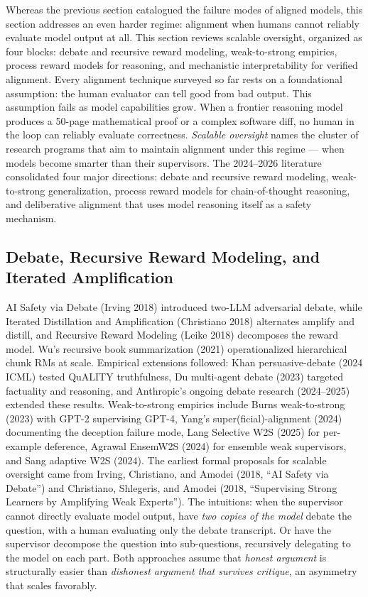 Whereas the previous section catalogued the failure modes of aligned models, this section addresses an even harder regime: alignment when humans cannot reliably evaluate model output at all. This section reviews scalable oversight, organized as four blocks: debate and recursive reward modeling, weak-to-strong empirics, process reward models for reasoning, and mechanistic interpretability for verified alignment. Every alignment technique surveyed so far rests on a foundational assumption: the human evaluator can tell good from bad output. This assumption fails as model capabilities grow. When a frontier reasoning model produces a 50-page mathematical proof or a complex software diff, no human in the loop can reliably evaluate correctness. \emph{Scalable oversight} names the cluster of research programs that aim to maintain alignment under this regime --- when models become smarter than their supervisors. The 2024--2026 literature consolidated four major directions: debate and recursive reward modeling, weak-to-strong generalization, process reward models for chain-of-thought reasoning, and deliberative alignment that uses model reasoning itself as a safety mechanism.

\subsection{Debate, Recursive Reward Modeling, and Iterated Amplification}\label{debate-recursive-reward-modeling-and-iterated-amplification}

AI Safety via Debate (Irving 2018) introduced two-LLM adversarial debate, while Iterated Distillation and Amplification (Christiano 2018) alternates amplify and distill, and Recursive Reward Modeling (Leike 2018) decomposes the reward model. Wu's recursive book summarization (2021) operationalized hierarchical chunk RMs at scale. Empirical extensions followed: Khan persuasive-debate (2024 ICML) tested QuALITY truthfulness, Du multi-agent debate (2023) targeted factuality and reasoning, and Anthropic's ongoing debate research (2024--2025) extended these results. Weak-to-strong empirics include Burns weak-to-strong (2023) with GPT-2 supervising GPT-4, Yang's super(ficial)-alignment (2024) documenting the deception failure mode, Lang Selective W2S (2025) for per-example deference, Agrawal EnsemW2S (2024) for ensemble weak supervisors, and Sang adaptive W2S (2024). The earliest formal proposals for scalable oversight came from Irving, Christiano, and Amodei (2018, ``AI Safety via Debate'') and Christiano, Shlegeris, and Amodei (2018, ``Supervising Strong Learners by Amplifying Weak Experts''). The intuitions: when the supervisor cannot directly evaluate model output, have \emph{two copies of the model} debate the question, with a human evaluating only the debate transcript. Or have the supervisor decompose the question into sub-questions, recursively delegating to the model on each part. Both approaches assume that \emph{honest argument} is structurally easier than \emph{dishonest argument that survives critique}, an asymmetry that scales favorably.

